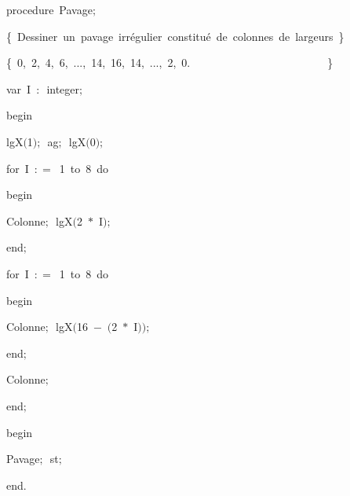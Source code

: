 {\pagebreak[3] 
\vspace{\neglskip}\mbox{\blc  \blk\idt  \mcl procedure\idt \ Pavage$;$}\par 
\vspace{\neglskip}\mbox{\blc  \blk\blk\idt  \cmt  \{\ Dessiner\ un\ pavage\ irrégulier\ constitué\ de\ colonnes\ de\ largeurs\ \}\idt }\par 
\vspace{\neglskip}\mbox{\blc  \blk\blk\idt  \cmt  \{\ 0,\ 2,\ 4,\ 6,\ ...,\ 14,\ 16,\ 14,\ ...,\ 2,\ 0.\ \ \ \ \ \ \ \ \ \ \ \ \ \ \ \ \ \ \ \ \ \ \ \ \ \}\idt }\par 
\pagebreak[3] 
\vspace{\neglskip}\mbox{\blc  \blk\blk\idt  \mcl var\idt \ I\ $:$\ integer$;$}\par 
\vspace{\neglskip}\mbox{\blc  \blk\idt  \mcl begin\idt }\par 
\vspace{\neglskip}\mbox{\blc  \blk\blk\idt  lgX$($1$)$$;$\ ag$;$\ lgX$($0$)$$;$}\par 
\pagebreak[3] 
\vspace{\neglskip}\mbox{\blc  \blk\blk\idt  \mcl for\idt \ I\ $:$$=$\ 1\ \mcl to\idt \ 8\ \mcl do\idt }\par 
\vspace{\neglskip}\mbox{\blc  \blk\blk\blk\idt  \mcl begin\idt }\par 
\vspace{\neglskip}\mbox{\blc  \blk\blk\blk\blk\idt  Colonne$;$\ lgX$($2\ $\ast$\ I$)$$;$}\par 
\vspace{\neglskip}\mbox{\blc  \blk\blk\blk\idt  \mcl end\idt $;$}\par 
\pagebreak[3] 
\vspace{\neglskip}\mbox{\blc  \blk\blk\idt  \mcl for\idt \ I\ $:$$=$\ 1\ \mcl to\idt \ 8\ \mcl do\idt }\par 
\vspace{\neglskip}\mbox{\blc  \blk\blk\blk\idt  \mcl begin\idt }\par 
\vspace{\neglskip}\mbox{\blc  \blk\blk\blk\blk\idt  Colonne$;$\ lgX$($16\ $-$\ $($2\ $\ast$\ I$)$$)$$;$}\par 
\vspace{\neglskip}\mbox{\blc  \blk\blk\blk\idt  \mcl end\idt $;$}\par 
\vspace{\neglskip}\mbox{\blc  \blk\blk\idt  Colonne$;$\ }\par 
\vspace{\neglskip}\mbox{\blc  \blk\idt  \mcl end\idt $;$}\par 
\medskip

\vspace{\neglskip}\mbox{\blc  \idt  \mcl begin\idt }\par 
\vspace{\neglskip}\mbox{\blc  \blk\idt  Pavage$;$\ st$;$}\par 
\vspace{\neglskip}\mbox{\blc  \idt  \mcl end\idt $.$}\par 

\medskip }

